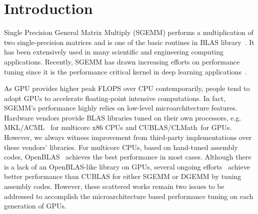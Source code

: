 \section{Introduction}
Single Precision General Matrix Multiply (SGEMM) performs a multiplication of two single-precision matrices and is one 
of the basic routines in BLAS library~\cite{blas}. It has been extensively used in many scientific and engineering 
computing applications. Recently, SGEMM has drawn increasing efforts on performance tuning since it is the performance 
critical kernel in deep learning applications~\cite{chetlur2014cudnn,nervana_sgemm_wiki}.


As GPU provides higher peak FLOPS over CPU contemporarily, people tend to adopt GPUs to accelerate
floating-point intensive computations. In fact, SGEMM's performance highly relies on low-level microarchitecture 
features. Hardware
vendors provide BLAS libraries tuned on their own processors, e.g. MKL/ACML~\cite{intel2007intel,amd2014} for multicore 
x86 CPUs and CUBLAS/CLMath~\cite{nvidia2008cublas, clmath}for
GPUs. However, we always witness improvement from third-party implementations over these vendors' libraries. For
multicore CPUs, based on hand-tuned assembly codes, OpenBLAS~\cite{xianyi2012openblas} achieves the best performance in 
most cases.
Although there is a lack of an OpenBLAS-like library on GPUs, several ongoing efforts~\cite{tan,lai,nervana_sgemm_wiki,
chien, volkov} achieve better performance than CUBLAS for either SGEMM or DGEMM by tuning assembly codes. However, 
these scattered works remain two issues to be addressed to accomplish the microarchitecture based performance tuning on 
each generation of GPUs.

